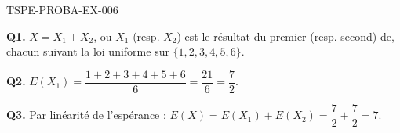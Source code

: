 \begin{corrige}{TSPE-PROBA-EX-006}

\textbf{Q1.} $X = X_1+X_2$, ou $X_1$ (resp. $X_2$) est le résultat du premier (resp. second) de, chacun suivant la loi uniforme sur $\{1,2,3,4,5,6\}$.

\textbf{Q2.} $E(X_1) = \dfrac{1+2+3+4+5+6}{6} = \dfrac{21}{6} = \dfrac{7}{2}$.

\textbf{Q3.} Par linéarité de l'espérance : $E(X) = E(X_1)+E(X_2) = \dfrac{7}{2}+\dfrac{7}{2} = \boxed{7}$.

\end{corrige}
